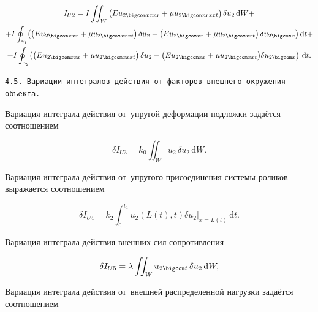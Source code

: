 \begin{multline}\label{Anisimov_eq22}

I_{U2}=I\iint_{W}\left(Eu_{2 \bigcom xxxx}+\mu u_{2 \bigcom xxxxt}\right)\delta u_2\,\mathrm{d}W+\\

+I\oint_{\gamma_1}\bigl(\left(Eu_{2 \bigcom xxx}+\mu u_{2 \bigcom xxxt}\right)\delta u_2-

\left(Eu_{2 \bigcom xx}+\mu u_{2 \bigcom xxt}\right)\delta u_{2 \bigcom x}\bigr)\,\mathrm{d}t+\\

+I\oint_{\gamma_2}\bigl(\left(Eu_{2 \bigcom xxx}+\mu u_{2 \bigcom xxxt}\right)\delta u_2-

\left(Eu_{2 \bigcom xx}+\mu u_{2 \bigcom xxt}\bigr)\delta u_{2 \bigcom x}\right)\,\mathrm{d}t.

\end{multline}



{\tt 4.5. Вариации интегралов действия от~факторов внешнего окружения \linebreak объекта.} 

Вариация интеграла действия от~упругой деформации подложки задаётся соотношением

\begin{equation}\label{Anisimov_eq24}

\delta I_{U3}=k_0\iint_{W}u_2\,\delta u_2\,\mathrm{d}W.

\end{equation}

Вариация интеграла действия от~упругого присоединения системы роликов выражается соотношением

\begin{equation}\label{Anisimov_eq24}

\delta I_{U4}=k_2\int_{0}^{t_1}u_2( L(t), t )\delta u_2\big|_{x=L(t)}\,\mathrm{d}t.

\end{equation}

Вариация интеграла действия внешних сил сопротивления 

\begin{equation}\label{Anisimov_eq27}

\delta I_{U5}=\lambda\iint_{W}u_{2 \bigcom t}\,\delta u_2\,\mathrm{d}W,

\end{equation}

Вариация интеграла действия от~внешней распределенной нагрузки задаётся соотношением

